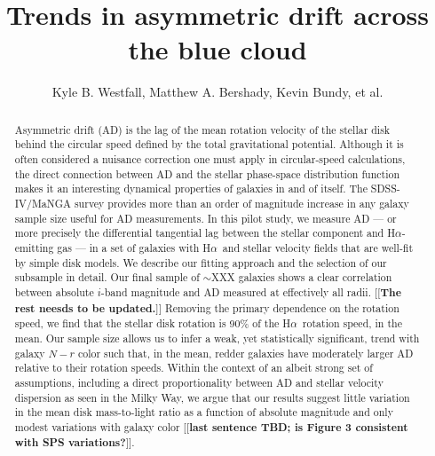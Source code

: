 \documentclass[apj,iop,revtex4,numberedappendix]{emulateapj}
\newcommand{\comment}[2][todo]{{\color{#1}[[{\bf #2}]]}}
\newcommand{\halpha}{H$\alpha$}
\begin{document}
\title{ Trends in asymmetric drift across the blue cloud }

\author{ Kyle B. Westfall, Matthew A.
Bershady, Kevin Bundy, et al. }





\begin{abstract}

Asymmetric drift (AD) is the lag of the mean rotation velocity of the
stellar disk behind the circular speed defined by the total
gravitational potential.  Although it is often considered a nuisance
correction one must apply in circular-speed calculations, the direct
connection between AD and the stellar phase-space distribution function
makes it an interesting dynamical properties of galaxies in and of
itself.  The SDSS-IV/MaNGA survey provides more than an order of
magnitude increase in any galaxy sample size useful for AD measurements.
In this pilot study, we measure AD --- or more precisely the
differential tangential lag between the stellar component and
\halpha-emitting gas --- in a set of galaxies with \halpha\ and stellar
velocity fields that are well-fit by simple disk models.  We describe
our fitting approach and the selection of our subsample in detail.  Our
final sample of $\sim$XXX galaxies shows a clear correlation between
absolute $i$-band magnitude and AD measured at effectively all radii.
\comment{The rest neesds to be updated.} Removing the primary dependence
on the rotation speed, we find that the stellar disk rotation is 90\% of
the \halpha\ rotation speed, in the mean.  Our sample size allows us to
infer a weak, yet statistically significant, trend with galaxy $N-r$
color such that, in the mean, redder galaxies have moderately larger AD
relative to their rotation speeds.  Within the context of an albeit
strong set of assumptions, including a direct proportionality between AD
and stellar velocity dispersion as seen in the Milky Way, we argue that
our results suggest little variation in the mean disk mass-to-light
ratio as a function of absolute magnitude and only modest variations
with galaxy color \comment{last sentence TBD; is Figure 3 consistent
with SPS variations?}.

\end{abstract}
\end{document}
